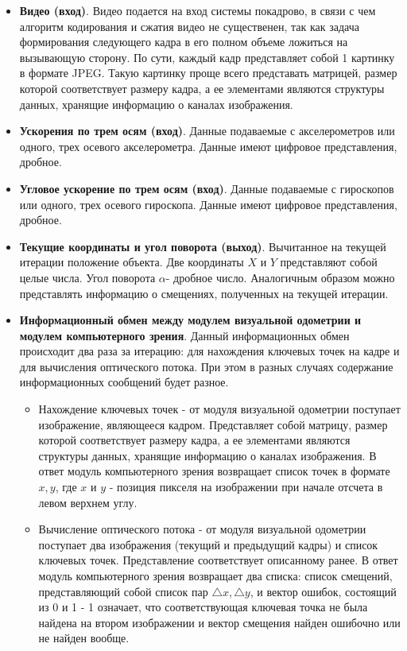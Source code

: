 \begin{itemize}
\item \textbf{Видео (вход)}. Видео подается на вход системы покадрово, в связи с чем алгоритм кодирования и сжатия видео не существенен, так как задача формирования следующего кадра в его полном объеме ложиться на вызывающую сторону. По сути, каждый кадр представляет собой 1 картинку в формате JPEG. Такую картинку проще всего представать матрицей, размер которой соответствует размеру кадра, а ее элементами являются структуры данных, хранящие информацию о каналах изображения.

\item \textbf{Ускорения по трем осям (вход)}. Данные подаваемые с акселерометров или одного, трех осевого акселерометра. Данные имеют цифровое представления, дробное. 

\item \textbf{Угловое ускорение по трем осям (вход)}. Данные подаваемые с гироскопов или одного, трех осевого гироскопа. Данные имеют цифровое представления, дробное. 

\item \textbf{Текущие координаты и угол поворота (выход)}. Вычитанное на текущей итерации положение объекта. Две координаты $X$ и $Y$ представляют собой целые числа. Угол поворота  $\alpha$- дробное число. Аналогичным образом можно представлять информацию о смещениях, полученных на текущей итерации. 

\item \textbf{Информационный обмен между модулем визуальной одометрии и модулем компьютерного зрения}. Данный информационных обмен происходит два раза за итерацию: для нахождения ключевых точек на кадре и для вычисления оптического потока. При этом в разных случаях содержание информационных сообщений будет разное.
	\begin{itemize}
	\item Нахождение ключевых точек - от модуля визуальной одометрии поступает изображение, являющееся кадром. Представляет собой матрицу, размер которой соответствует размеру кадра, а ее элементами являются структуры данных, хранящие информацию о каналах изображения. В ответ модуль компьютерного зрения возвращает список точек в формате ${x, y}$, где $x$ и $y$ - позиция пикселя на изображении при начале отсчета в левом верхнем углу. 
	
	\item Вычисление оптического потока - от модуля визуальной одометрии поступает два изображения (текущий и предыдущий кадры) и список ключевых точек. Представление соответствует описанному ранее. В ответ модуль компьютерного зрения возвращает два списка: список смещений, представляющий собой список пар $\triangle x, \triangle y$, и вектор ошибок, состоящий из 0 и 1 - 1 означает, что соответствующая ключевая точка не была найдена на втором изображении и вектор смещения найден ошибочно или не найден вообще. 
	
	\end{itemize}
\end{itemize}

